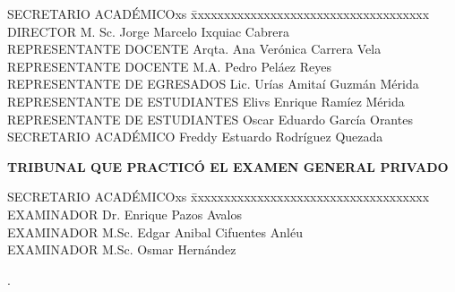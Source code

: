 {\doublespacing{}
\begin{tabbing}
  SECRETARIO ACADÉMICOxs \= xxxxxxxxxxxxxxxxxxxxxxxxxxxxxxxxxxxx  \kill
  DIRECTOR \> \hspace{60pt} M. Sc. Jorge Marcelo Ixquiac Cabrera \\
  REPRESENTANTE DOCENTE \>  \hspace{60pt} Arqta. Ana Verónica Carrera Vela\\
  REPRESENTANTE DOCENTE \>  \hspace{60pt} M.A. Pedro Peláez Reyes\\
  REPRESENTANTE DE EGRESADOS \>  \hspace{60pt} Lic. Urías Amitaí Guzmán Mérida\\
  REPRESENTANTE DE ESTUDIANTES \>  \hspace{60pt} Elivs Enrique Ramíez Mérida\\
  REPRESENTANTE DE ESTUDIANTES \> \hspace{60pt} Oscar Eduardo García Orantes\\
  SECRETARIO ACADÉMICO\>  \hspace{60pt} Freddy Estuardo Rodríguez Quezada\\
\end{tabbing}

\vspace{24pt}

\begin{center}
\textbf{TRIBUNAL QUE PRACTICÓ EL EXAMEN GENERAL PRIVADO}
\end{center}

\begin{tabbing}
  SECRETARIO ACADÉMICOxs \= xxxxxxxxxxxxxxxxxxxxxxxxxxxxxxxxxxxx  \kill
  EXAMINADOR \> \hspace{60pt} Dr\@. Enrique Pazos Avalos\\
  EXAMINADOR \>  \hspace{60pt} M.Sc. Edgar Anibal Cifuentes Anléu  \\
  EXAMINADOR \>  \hspace{60pt} M.Sc. Osmar Hernández \\
\end{tabbing}
\par}

\newpage
\textcolor[rgb]{1,1,1}{.} 

\thispagestyle{empty}
\newpage